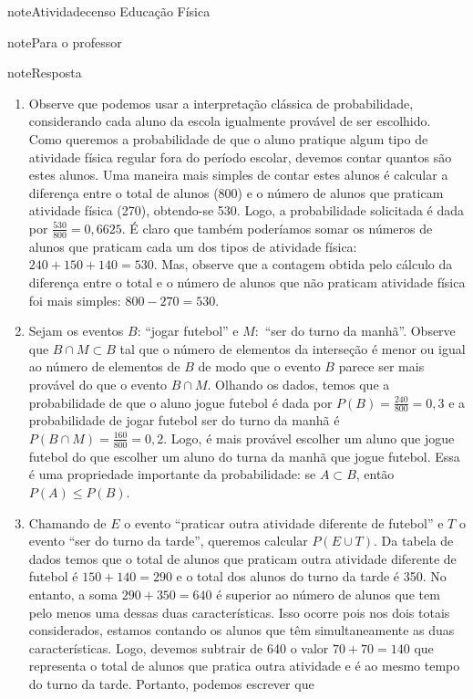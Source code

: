 \begin{sphinxadmonition}{note}{Atividade}{censo Educação Física}
\begin{sphinxadmonition}{note}{Para o professor}
\begin{sphinxadmonition}{note}{Resposta}
\begin{enumerate}
\item {} 
Observe que podemos usar a interpretação clássica de probabilidade, considerando cada aluno da escola igualmente provável de ser escolhido. Como queremos a probabilidade de que o aluno pratique algum tipo de atividade física regular fora do período escolar, devemos contar quantos são estes alunos.  Uma maneira mais simples de contar estes alunos é calcular a diferença entre o total de alunos (800) e o número de alunos que  praticam atividade física (270), obtendo-se 530. Logo, a probabilidade solicitada é dada por \(\frac{530}{800}=0,6625\). É claro que também poderíamos somar os números de alunos que praticam cada um dos tipos de atividade física: \(240+150+140=530\). Mas, observe que a contagem obtida pelo cálculo da diferença entre o total e o número de alunos que não praticam atividade física foi mais simples: \(800-270=530\).

\item {} 
Sejam os eventos \(B\): “jogar futebol” e \(M:\) “ser do turno da manhã”. Observe que \(B\cap M\subset B\) tal que o número de elementos da interseção é menor ou igual ao número de elementos de \(B\) de modo que o evento \(B\) parece ser mais provável do que o evento \(B\cap M\). Olhando os dados, temos que a probabilidade de que o aluno jogue futebol é dada por \(P(B)=\frac{240}{800}=0,3\) e a probabilidade de jogar futebol  ser do turno da manhã é \(P(B\cap M)=\frac{160}{800}=0,2\). Logo, é mais provável escolher um aluno que jogue futebol do que escolher um aluno do turna da manhã que jogue futebol. Essa é uma propriedade importante da probabilidade: se \(A\subset B\), então \(P(A)\leq P(B)\).

\item {} 
Chamando de \(E\) o evento “praticar outra atividade diferente de futebol” e \(T\) o evento “ser do turno da tarde”, queremos calcular \(P(E\cup T)\).  Da tabela de dados temos que o total de alunos que praticam outra atividade diferente de futebol é \(150+140=290\) e o total dos alunos do turno da tarde é 350. No entanto, a soma \(290+350=640\) é superior ao número de alunos que tem pelo menos uma dessas duas características. Isso ocorre pois nos dois totais considerados, estamos contando os alunos que têm simultaneamente as duas características. Logo, devemos subtrair de 640 o valor \(70+70=140\) que representa o total de alunos que pratica outra atividade e é ao mesmo tempo do turno da tarde. Portanto, podemos escrever que


\end{enumerate}
\end{sphinxadmonition}
\end{sphinxadmonition}
\end{sphinxadmonition}
